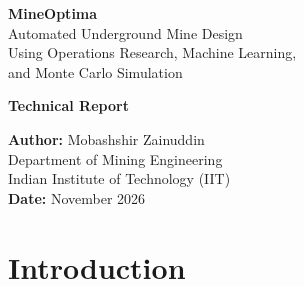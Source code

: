 \documentclass[12pt,a4paper]{article}
\begin{document}
\begin{titlepage}
\centering
\vspace*{2cm}

{\Huge\bfseries MineOptima}\\[0.5cm]
{\LARGE Automated Underground Mine Design\\Using Operations Research, Machine Learning,\\and Monte Carlo Simulation}

\vspace{2cm}

{\Large\bfseries Technical Report}

\vspace{1.5cm}

{\large
\textbf{Author:} Mobashshir Zainuddin\\[0.3cm]
Department of Mining Engineering\\
Indian Institute of Technology (IIT)\\[1cm]
\textbf{Date:} November 2026
}

\vspace{2cm}

\begin{abstract}
\noindent
This report presents \textbf{MineOptima}, an integrated computational platform for automated underground gold mine design. The system combines Binary Integer Linear Programming (BILP) for stope layout optimization, Random Forest machine learning for grade prediction, Monte Carlo simulation for risk analysis, production scheduling with Discounted Cash Flow (DCF) NPV, and geotechnical stability assessment using the Mathews method. The platform models an Archean lode gold deposit with geologically realistic log-normal grade distribution (CV $\sim$180\%), nugget effect, and vein-hosted structures---calibrated against published parameters from Canadian Shield gold operations. Built with a Flask + Python backend and Plotly.js frontend, the system replaces weeks of manual mine design iteration with a pipeline that runs in under 60 seconds. This report details the methodology, implementation, results, and future research directions.
\end{abstract}

\end{titlepage}

\tableofcontents
\newpage

\section{Introduction}
\label{sec:introduction}
\end{document}
